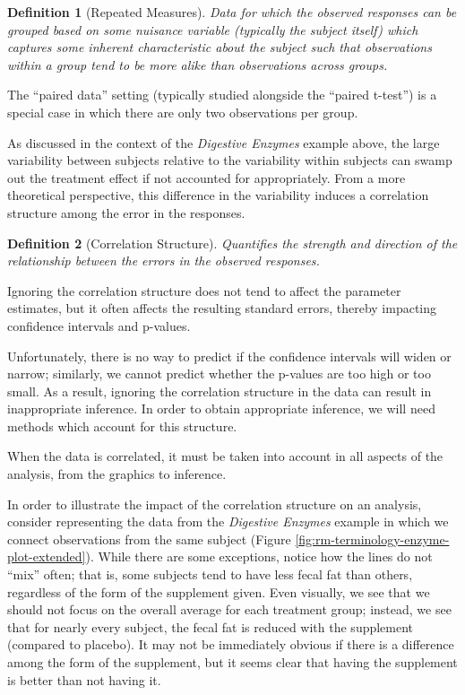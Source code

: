 \documentclass[
]{book}
\theoremstyle{plain}
\theoremstyle{mydefn}
\newtheorem{definition}{Definition}[chapter]
\theoremstyle{myexmpl}
\theoremstyle{remark}
\begin{document}
\begin{definition}[Repeated Measures]
Data for which the observed responses can be grouped based on some nuisance variable (typically the subject itself) which captures some inherent characteristic about the subject such that observations within a group tend to be more alike than observations across groups.
\end{definition}

\begin{rmdtip}
The ``paired data'' setting (typically studied alongside the ``paired t-test'') is a special case in which there are only two observations per group.
\end{rmdtip}

As discussed in the context of the \emph{Digestive Enzymes} example above, the large variability between subjects relative to the variability within subjects can swamp out the treatment effect if not accounted for appropriately. From a more theoretical perspective, this difference in the variability induces a correlation structure among the error in the responses.

\begin{definition}[Correlation Structure]
Quantifies the strength and direction of the relationship between the errors in the observed responses.
\end{definition}

\begin{rmdkeyidea}
Ignoring the correlation structure does not tend to affect the parameter estimates, but it often affects the resulting standard errors, thereby impacting confidence intervals and p-values.
\end{rmdkeyidea}

Unfortunately, there is no way to predict if the confidence intervals will widen or narrow; similarly, we cannot predict whether the p-values are too high or too small. As a result, ignoring the correlation structure in the data can result in inappropriate inference. In order to obtain appropriate inference, we will need methods which account for this structure.

\begin{rmdkeyidea}
When the data is correlated, it must be taken into account in all aspects of the analysis, from the graphics to inference.
\end{rmdkeyidea}

In order to illustrate the impact of the correlation structure on an analysis, consider representing the data from the \emph{Digestive Enzymes} example in which we connect observations from the same subject (Figure \ref{fig:rm-terminology-enzyme-plot-extended}). While there are some exceptions, notice how the lines do not ``mix'' often; that is, some subjects tend to have less fecal fat than others, regardless of the form of the supplement given. Even visually, we see that we should not focus on the overall average for each treatment group; instead, we see that for nearly every subject, the fecal fat is reduced with the supplement (compared to placebo). It may not be immediately obvious if there is a difference among the form of the supplement, but it seems clear that having the supplement is better than not having it.
\end{document}
